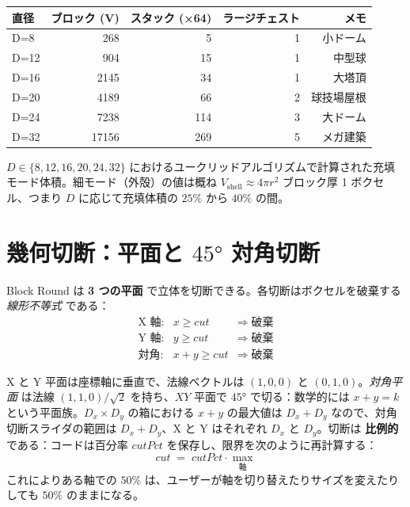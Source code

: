 \documentclass[12pt,a4paper]{scrartcl}
\newcommand{\acc}[1]{\textcolor{accent}{\textbf{#1}}}
\begin{document}
\vspace{0.5em}
\begin{center}
\begin{tabular}{@{}lrrrr@{}}
\toprule
\textbf{直径} & \textbf{ブロック (V)} & \textbf{スタック (×64)} & \textbf{ラージチェスト} & \textbf{メモ} \\
\midrule
D=8   &   268 &  5  & 1 & 小ドーム  \\
D=12  &   904 & 15  & 1 & 中型球 \\
D=16  &  2145 & 34  & 1 & 大塔頂 \\
D=20  &  4189 & 66  & 2 & 球技場屋根 \\
D=24  &  7238 & 114 & 3 & 大ドーム \\
D=32  & 17156 & 269 & 5 & メガ建築 \\
\bottomrule
\end{tabular}
\end{center}

$D \in \{8,12,16,20,24,32\}$ におけるユークリッドアルゴリズムで計算された充填モード体積。細モード（外殻）の値は概ね $V_{\mathrm{shell}} \approx 4\pi r^2$ ブロック厚 1 ボクセル、つまり $D$ に応じて充填体積の $25\%$ から $40\%$ の間。

\section{幾何切断：平面と $45°$ 対角切断}

Block Round は \acc{3 つの平面} で立体を切断できる。各切断はボクセルを破棄する \emph{線形不等式} である：
\[
\begin{array}{lcl}
\text{X 軸:}    & x \geq \mathit{cut}      & \Rightarrow\; \text{破棄} \\
\text{Y 軸:}    & y \geq \mathit{cut}      & \Rightarrow\; \text{破棄} \\
\text{対角:}  & x + y \geq \mathit{cut}  & \Rightarrow\; \text{破棄}
\end{array}
\]

X と Y 平面は座標軸に垂直で、法線ベクトルは $(1,0,0)$ と $(0,1,0)$。\emph{対角平面} は法線 $(1,1,0)/\sqrt{2}$ を持ち、$XY$ 平面で $45°$ で切る：数学的には $x+y = k$ という平面族。$D_x \times D_y$ の箱における $x+y$ の最大値は $D_x + D_y$ なので、対角切断スライダの範囲は $D_x + D_y$、X と Y はそれぞれ $D_x$ と $D_y$。切断は \acc{比例的} である：コードは百分率 $\mathit{cutPct}$ を保存し、限界を次のように再計算する：
\[
\mathit{cut} \;=\; \mathit{cutPct} \cdot \max_{\text{軸}}
\]
これによりある軸での $50\%$ は、ユーザーが軸を切り替えたりサイズを変えたりしても $50\%$ のままになる。
\end{document}
